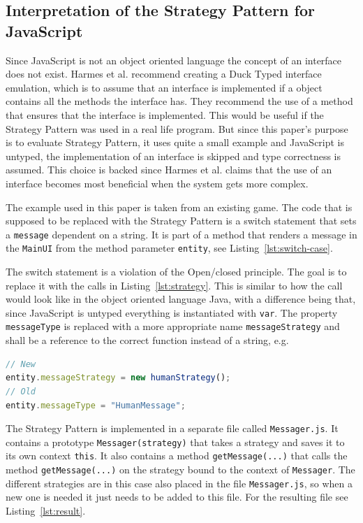\documentclass[conference, a4paper]{IEEEtran}
\begin{document}
\subsection{Interpretation of the Strategy Pattern for JavaScript}
\label{sec:JavaScript}
Since JavaScript is not an object oriented language the concept of an interface does not exist. Harmes et al. recommend creating a Duck Typed interface emulation, which is to assume that an interface is implemented if a object contains all the methods the interface has. They recommend the use of a method that ensures that the interface is implemented. This would be useful if the Strategy Pattern was used in a real life program. But since this paper's purpose is to evaluate Strategy Pattern, it uses quite a small example and JavaScript is untyped, the implementation of an interface is skipped and type correctness is assumed. This choice is backed since Harmes et al. claims that the use of an interface becomes most beneficial when the system gets more complex.~\cite{bibitem:DiazHarmes}

The example used in this paper is taken from an existing game. The code that is supposed to be replaced with the Strategy Pattern is a switch statement that sets a \texttt{message} dependent on a string. It is part of a method that renders a message in the \texttt{MainUI} from the method parameter \texttt{entity}, see Listing~\ref{lst:switch-case}.

The switch statement is a violation of the Open/closed principle. The goal is to replace it with the calls in Listing~\ref{lst:strategy}. This is similar to how the call would look like in the object oriented language Java, with a difference being that, since JavaScript is untyped everything is instantiated with \texttt{var}. The property \texttt{messageType} is replaced with a more appropriate name \texttt{messageStrategy} and shall be a reference to the correct function instead of a string, e.g.

\begin{lstlisting}[language=JavaScript]
// New
entity.messageStrategy = new humanStrategy();
// Old
entity.messageType = "HumanMessage";
\end{lstlisting}

The Strategy Pattern is implemented in a separate file called \texttt{Messager.js}. It contains a prototype \texttt{Messager(strategy)} that takes a strategy and saves it to its own context \texttt{this}. It also contains a method \texttt{getMessage(...)} that calls the method \texttt{getMessage(...)} on the strategy bound to the context of \texttt{Messager}. The different strategies are in this case also placed in the file \texttt{Messager.js}, so when a new one is needed it just needs to be added to this file. For the resulting file see Listing~\ref{lst:result}.
\end{document}
